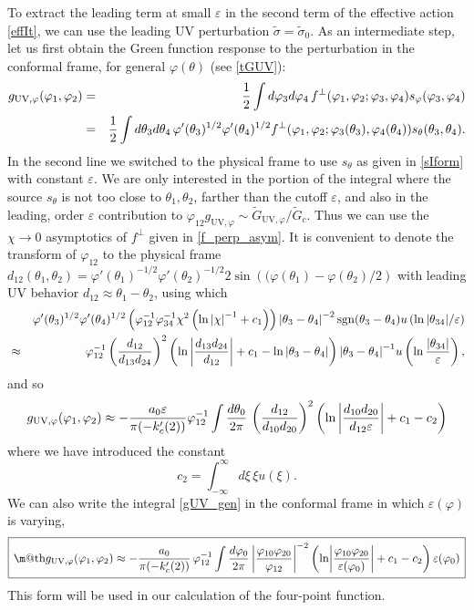 \documentclass[12pt]{article}
\makeatletter
\newcommand*{\wideboxed}[1]{\setlength{\fboxsep}{1ex}%
  \fbox{\m@th$\displaystyle#1$}}
\DeclareMathOperator{\sgn}{sgn}
\newcommand{\UV}{\text{UV}}
\newcommand{\tG}{\widetilde{G}}
\newcommand{\tsig}{\tilde{\sigma}}
\newcommand{\tht}{\theta}
\newcommand{\vep}{\varepsilon}
\newcommand{\vp}{\varphi}
\newcommand{\be}{\begin{equation}}
\newcommand{\ee}{\end{equation}}
\newcommand{\bea}{\begin{eqnarray}}
\newcommand{\eea}{\end{eqnarray}}
\newcommand{\nn}{\nonumber\\}
\newcommand{\ov}{\over}
\makeatother
\begin{document}
To extract the leading term at small $\vep$ in the second term of the effective action \eqref{effIt}, we can use the leading UV perturbation $\tsig=\tsig_0$. As an intermediate step, let us first obtain the Green function response to the perturbation in the conformal frame, for general $\vp(\tht)$ (see \eqref{tGUV}):
\bea
g_{\UV, \vp}(\vp_1, \vp_2)&=&{1 \ov 2}\int d\vp_3 d\vp_4\, f^{\perp}(\vp_1, \vp_2; \vp_3, \vp_4)s_{\vp}(\vp_3, \vp_4)\nn
&=&{1 \ov 2}\int d\tht_3 d\tht_4\, \vp'(\tht_3)^{1/2}\vp'(\tht_4)^{1/2}f^{\perp}(\vp_1, \vp_2; \vp_3(\tht_3), \vp_4(\tht_4))s_{\tht}(\tht_3, \tht_4).
\eea
In the second line we switched to the physical frame to use $s_{\tht}$ as given in \eqref{sIform} with constant $\vep$. We are only interested in the portion of the integral where the source $s_{\tht}$ is not too close to $\tht_1, \tht_2$, farther than the cutoff $\vep$, and also in the leading, order $\vep$ contribution to $\vp_{12}g_{\UV, \vp} \sim \tG_{\UV, \vp}/\tG_c$. Thus we can use the $\chi \to 0$ asymptotics of $f^{\perp}$ given in \eqref{f_perp_asym}. It is convenient to denote the transform of $\vp_{12}$ to the physical frame $d_{12}(\tht_1, \tht_2)=\vp'(\tht_1)^{-1/2}\vp'(\tht_2)^{-1/2}2\sin\left( (\vp(\tht_1)-\vp(\tht_2)/2\right)$ with leading UV behavior $d_{12} \approx \tht_1-\tht_2$, using which 
\bea \label{gUVdet}
&&\vp'(\tht_3)^{1/2}\vp'(\tht_4)^{1/2}\left(\vp_{12}^{-1}\vp_{34}^{-1}\chi^2 \left( \ln \abs{\chi}^{-1}+c_1\right)\right)\abs{\tht_3-\tht_4}^{-2}\sgn(\tht_3-\tht_4)u\left(\ln  \abs{\tht_{34}}/ \vep\right)\nn
&\approx &\vp_{12}^{-1}\left( {d_{12} \ov d_{13}d_{24}}\right)^2 \left( \ln \abs{{d_{13}d_{24} \ov d_{12}}}+c_1-\ln \abs{\tht_3-\tht_4}\right)\abs{\tht_3-\tht_4}^{-1}u\left( \ln {\abs{\tht_{34}} \ov \vep} \right),
\eea
and so
\be \label{gUV_gen}
g_{\UV, \vp}(\vp_1, \vp_2) \approx -{a_0 \vep \ov \pi(-k_c'(2))}\vp_{12}^{-1}\int {d\tht_0 \ov 2 \pi}\, \left( {d_{12} \ov d_{10}d_{20}}\right)^2 \left( \ln \abs{{d_{10}d_{20} \ov d_{12} \vep}} + c_1-c_2\right)
\ee
where we have introduced the constant
\be
c_2=\int_{-\infty}^{\infty} d\xi\, \xi u(\xi).
\ee
We can also write the integral \eqref{gUV_gen} in the conformal frame in which $\vep(\vp)$ is varying,
\begin{equation}\label{gUV_gen_conf}
\wideboxed{
g_{\UV, \vp}(\vp_1, \vp_2)
\approx-{a_0 \ov \pi (-k_c'(2))}\,\vp_{12}^{-1}
\int\frac{d\vp_0}{2\pi}\,\biggl|\frac{\vp_{10}\vp_{20}}{\vp_{12}}\biggr|^{-2}
\left(\ln\biggl|\frac{\vp_{10}\vp_{20}}{\vep(\vp_0)}\biggr|+c_1-c_2\right)
\vep(\vp_0)
}
\end{equation}
This form will be used in our calculation of the four-point function.
\end{document}
